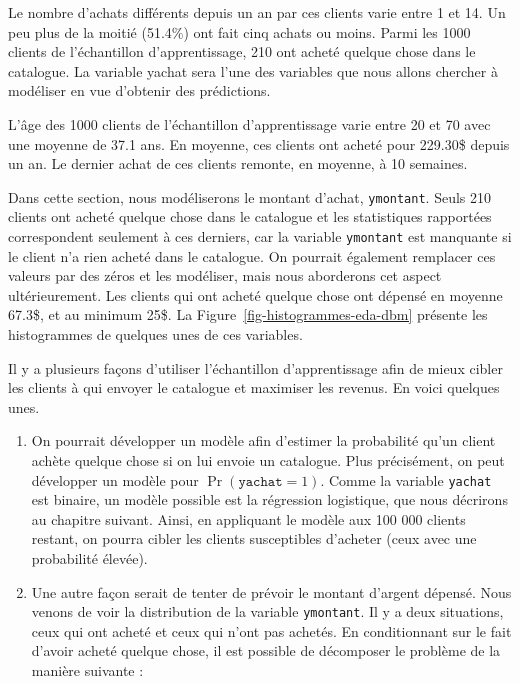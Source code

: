 \documentclass[
  11pt,
  letterpaper,
]{book}
\providecommand{\tightlist}{%
  \setlength{\itemsep}{0pt}\setlength{\parskip}{0pt}}\usepackage{longtable,booktabs,array}
\theoremstyle{definition}
\theoremstyle{remark}
\begin{document}
Le nombre d'achats différents depuis un an par ces clients varie entre 1
et 14. Un peu plus de la moitié (51.4\%) ont fait cinq achats ou moins.
Parmi les 1000 clients de l'échantillon d'apprentissage, 210 ont acheté
quelque chose dans le catalogue. La variable yachat sera l'une des
variables que nous allons chercher à modéliser en vue d'obtenir des
prédictions.

L'âge des 1000 clients de l'échantillon d'apprentissage varie entre 20
et 70 avec une moyenne de 37.1 ans. En moyenne, ces clients ont acheté
pour 229.30\$ depuis un an. Le dernier achat de ces clients remonte, en
moyenne, à 10 semaines.

Dans cette section, nous modéliserons le montant d'achat,
\texttt{ymontant}. Seuls 210 clients ont acheté quelque chose dans le
catalogue et les statistiques rapportées correspondent seulement à ces
derniers, car la variable \texttt{ymontant} est manquante si le client
n'a rien acheté dans le catalogue. On pourrait également remplacer ces
valeurs par des zéros et les modéliser, mais nous aborderons cet aspect
ultérieurement. Les clients qui ont acheté quelque chose ont dépensé en
moyenne 67.3\$, et au minimum 25\$. La
Figure~\ref{fig-histogrammes-eda-dbm} présente les histogrammes de
quelques unes de ces variables.

Il y a plusieurs façons d'utiliser l'échantillon d'apprentissage afin de
mieux cibler les clients à qui envoyer le catalogue et maximiser les
revenus. En voici quelques unes.

\begin{enumerate}
\def\labelenumi{\alph{enumi})}
\tightlist
\item
  On pourrait développer un modèle afin d'estimer la probabilité qu'un
  client achète quelque chose si on lui envoie un catalogue. Plus
  précisément, on peut développer un modèle pour
  \(\Pr(\texttt{yachat}=1)\). Comme la variable \texttt{yachat} est
  binaire, un modèle possible est la régression logistique, que nous
  décrirons au chapitre suivant. Ainsi, en appliquant le modèle aux 100
  000 clients restant, on pourra cibler les clients susceptibles
  d'acheter (ceux avec une probabilité élevée).
\item
  Une autre façon serait de tenter de prévoir le montant d'argent
  dépensé. Nous venons de voir la distribution de la variable
  \texttt{ymontant}. Il y a deux situations, ceux qui ont acheté et ceux
  qui n'ont pas achetés. En conditionnant sur le fait d'avoir acheté
  quelque chose, il est possible de décomposer le problème de la manière
  suivante :
\end{enumerate}
\end{document}
